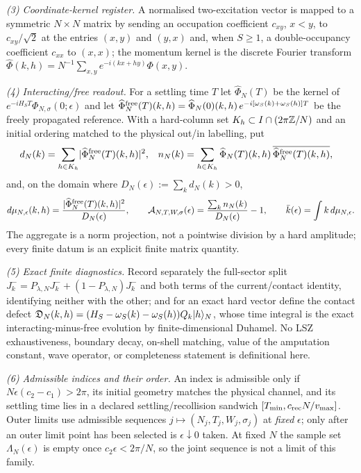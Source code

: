 \begin{definition}
\emph{(3) Coordinate-kernel register.} A normalised two-excitation vector is
mapped to a symmetric $N\times N$ matrix by sending an occupation coefficient
$c_{xy}$, $x<y$, to $c_{xy}/\sqrt2$ at the entries $(x,y)$ and $(y,x)$ and,
when $S\ge1$, a double-occupancy coefficient $c_{xx}$ to $(x,x)$; the momentum
kernel is the discrete Fourier transform
$\widehat\Phi(k,h)=N^{-1}\sum_{x,y}e^{-i(kx+hy)}\Phi(x,y)$.

\emph{(4) Interacting/free readout.} For a settling time $T$ let
$\widehat\Phi_N(T)$ be the kernel of $e^{-iH_ST}\Phi_{N,\sigma}(0;\epsilon)$
and let
$\widehat\Phi_N^{\rm free}(T)(k,h)=\widehat\Phi_N(0)(k,h)\,
e^{-i[\omega_S(k)+\omega_S(h)]T}$ be the freely propagated reference. With a
hard-column set $K_h\subset I\cap(2\pi\mathbb{Z}/N)$ and an initial ordering matched to
the physical out/in labelling, put
\begin{align}
  d_N(k)&=\sum_{h\in K_h}\lvert \widehat\Phi_N^{\rm free}(T)(k,h)\rvert^2, &
  n_N(k)&=\sum_{h\in K_h}\widehat\Phi_N(T)(k,h)\,
          \overline{\widehat\Phi_N^{\rm free}(T)(k,h)},
  \label{eq:d29-rows}
\end{align}
and, on the domain where $D_N(\epsilon):=\sum_k d_N(k)>0$,
\begin{equation}
  d\mu_{N,\epsilon}(k,h)=
  \frac{\lvert \widehat\Phi_N^{\rm free}(T)(k,h)\rvert^2}{D_N(\epsilon)},
  \qquad
  \mathcal{A}_{N,T,W,\sigma}(\epsilon)=
  \frac{\sum_k n_N(k)}{D_N(\epsilon)}-1,
  \qquad
  \bar k(\epsilon)=\int k\,d\mu_{N,\epsilon}.
  \label{eq:d29-datum}
\end{equation}
The aggregate is a norm projection, not a pointwise division by a hard
amplitude; every finite datum is an explicit finite matrix quantity.

\emph{(5) Exact finite diagnostics.} Record separately the full-sector split
$J^-_k=P_{\lambda,N}J^-_k+(1-P_{\lambda,N})J^-_k$ and both terms of the
current/contact identity, identifying neither with the other; and for an exact
hard vector define the contact defect
$\mathfrak D_N(k,h)=(H_S-\omega_S(k)-\omega_S(h))Q_k|h\rangle_N$, whose time
integral is the exact interacting-minus-free evolution by finite-dimensional
Duhamel. No LSZ exhaustiveness, boundary decay, on-shell matching, value of
the amputation constant, wave operator, or completeness statement is
definitional here.

\emph{(6) Admissible indices and their order.} An index is admissible only if
$N\epsilon(c_2-c_1)>2\pi$, its initial geometry matches the physical channel,
and its settling time lies in a declared settling/recollision sandwich
$[T_{\min},c_{\rm rec}N/v_{\max}]$. Outer limits use admissible sequences
$j\mapsto(N_j,T_j,W_j,\sigma_j)$ at \emph{fixed} $\epsilon$; only after an
outer limit point has been selected is $\epsilon\downarrow0$ taken. At fixed
$N$ the sample set $\Lambda_N(\epsilon)$ is empty once $c_2\epsilon<2\pi/N$,
so the joint sequence is not a limit of this family.
\end{definition}

